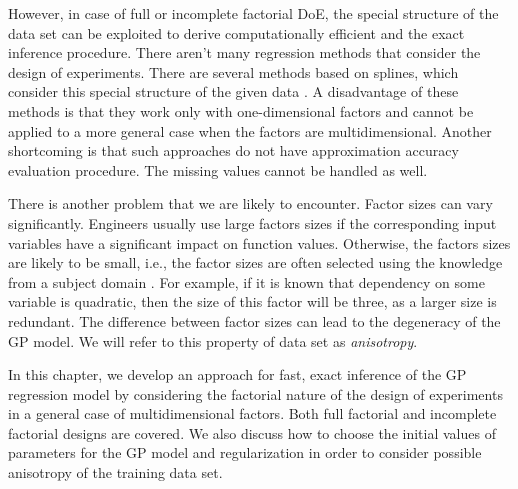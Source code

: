 However, in case of full or incomplete factorial DoE, the special structure
of the data set can be exploited to derive computationally efficient
and the exact inference procedure.
There aren't many regression methods that consider the design of experiments.
There are several methods based on splines, which consider this special structure of the given data \citep{stone97polynomialsplines}.
A disadvantage of these methods is that they work only with one-dimensional factors
and cannot be applied to a more general case when the factors are multidimensional.
Another shortcoming is that such approaches do not have approximation accuracy evaluation procedure.
The missing values cannot be handled as well.


There is another problem that we are likely to encounter.
Factor sizes can vary significantly.
Engineers usually use large factors sizes if the corresponding input variables have a significant impact on function values.
Otherwise, the factors sizes are likely to be small,
i.e., the factor sizes are often selected using the knowledge from a subject domain \citep{rendall2008aircraftSurface}.
For example, if it is known that dependency on some variable is quadratic,
then the size of this factor will be three, as a larger size is redundant.
The difference between factor sizes can lead to the degeneracy of the GP model.
We will refer to this property of data set as {\em anisotropy}.

In this chapter, we develop an approach for fast, exact inference of the GP regression
model by considering
the factorial nature of the design of experiments in a general case of multidimensional factors.
Both full factorial and incomplete factorial designs are covered.
We also discuss how to choose the initial values of parameters for
the GP model and regularization in order to
consider possible anisotropy of the training data set.

